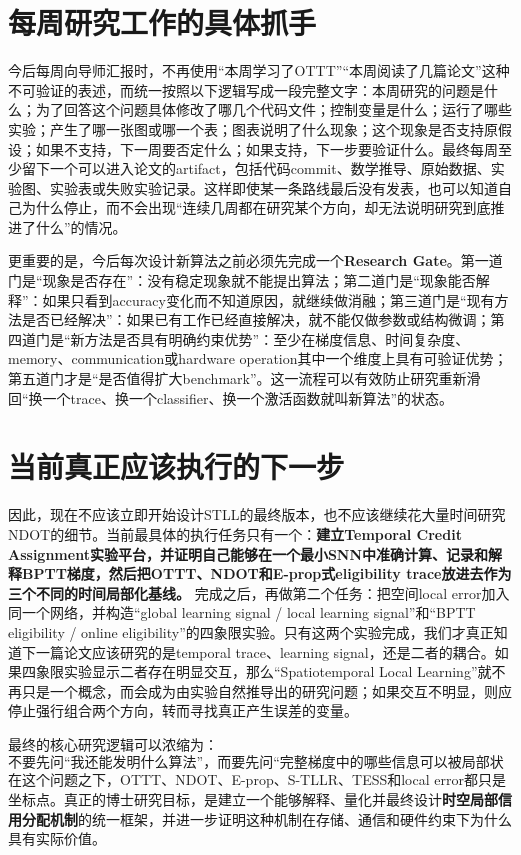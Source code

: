 \documentclass[journal,12pt,onecolumn]{IEEEtran}
\begin{document}
\section{每周研究工作的具体抓手}

今后每周向导师汇报时，不再使用“本周学习了OTTT”“本周阅读了几篇论文”这种不可验证的表述，而统一按照以下逻辑写成一段完整文字：本周研究的问题是什么；为了回答这个问题具体修改了哪几个代码文件；控制变量是什么；运行了哪些实验；产生了哪一张图或哪一个表；图表说明了什么现象；这个现象是否支持原假设；如果不支持，下一周要否定什么；如果支持，下一步要验证什么。最终每周至少留下一个可以进入论文的artifact，包括代码commit、数学推导、原始数据、实验图、实验表或失败实验记录。这样即使某一条路线最后没有发表，也可以知道自己为什么停止，而不会出现“连续几周都在研究某个方向，却无法说明研究到底推进了什么”的情况。

更重要的是，今后每次设计新算法之前必须先完成一个\textbf{Research Gate}。第一道门是“现象是否存在”：没有稳定现象就不能提出算法；第二道门是“现象能否解释”：如果只看到accuracy变化而不知道原因，就继续做消融；第三道门是“现有方法是否已经解决”：如果已有工作已经直接解决，就不能仅做参数或结构微调；第四道门是“新方法是否具有明确约束优势”：至少在梯度信息、时间复杂度、memory、communication或hardware operation其中一个维度上具有可验证优势；第五道门才是“是否值得扩大benchmark”。这一流程可以有效防止研究重新滑回“换一个trace、换一个classifier、换一个激活函数就叫新算法”的状态。

\section{当前真正应该执行的下一步}

因此，现在不应该立即开始设计STLL的最终版本，也不应该继续花大量时间研究NDOT的细节。当前最具体的执行任务只有一个：\textbf{建立Temporal Credit Assignment实验平台，并证明自己能够在一个最小SNN中准确计算、记录和解释BPTT梯度，然后把OTTT、NDOT和E-prop式eligibility trace放进去作为三个不同的时间局部化基线。} 完成之后，再做第二个任务：把空间local error加入同一个网络，并构造“global learning signal / local learning signal”和“BPTT eligibility / online eligibility”的四象限实验。只有这两个实验完成，我们才真正知道下一篇论文应该研究的是temporal trace、learning signal，还是二者的耦合。如果四象限实验显示二者存在明显交互，那么“Spatiotemporal Local Learning”就不再只是一个概念，而会成为由实验自然推导出的研究问题；如果交互不明显，则应停止强行组合两个方向，转而寻找真正产生误差的变量。

最终的核心研究逻辑可以浓缩为：
\begin{equation}
\boxed{
\text{不要先问“我还能发明什么算法”，而要先问“完整梯度中的哪些信息可以被局部状态可靠地保留？”}
}
\end{equation}
在这个问题之下，OTTT、NDOT、E-prop、S-TLLR、TESS和local error都只是坐标点。真正的博士研究目标，是建立一个能够解释、量化并最终设计\textbf{时空局部信用分配机制}的统一框架，并进一步证明这种机制在存储、通信和硬件约束下为什么具有实际价值。
\end{document}
